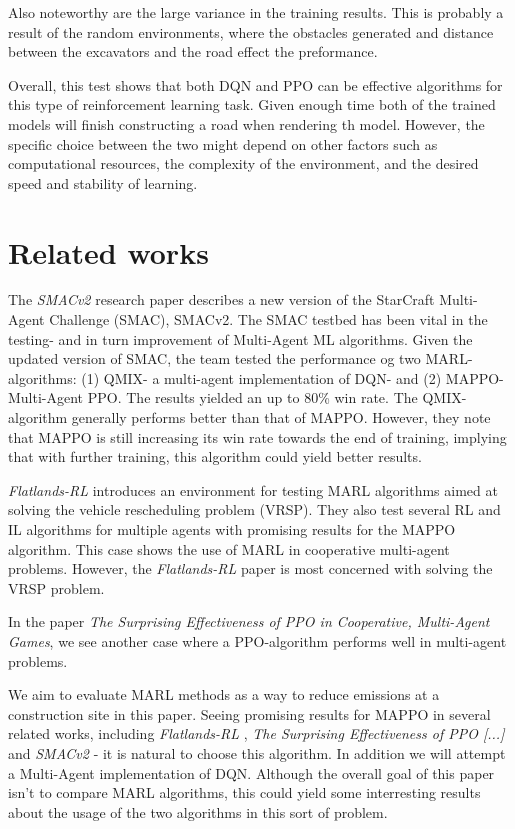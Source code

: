 \documentclass[conference]{IEEEtran}
\begin{document}
Also noteworthy are the large variance in the training results. This is probably a result of the random environments, where the obstacles generated and distance between the excavators and the road effect the preformance.

Overall, this test shows that both DQN and PPO can be effective algorithms for this type of reinforcement
learning task. Given enough time both of the trained models will finish constructing a road when rendering th model.
However, the specific choice between the two might depend on other factors such as
computational resources, the complexity of the environment, and the desired speed and stability of
learning.




\section{Related works}
The \textit{SMACv2} \cite{ellis2022smacv2} research paper describes a new version of the StarCraft Multi-Agent
Challenge (SMAC), SMACv2. The SMAC testbed has been vital in the testing- and in turn improvement
of Multi-Agent ML algorithms. Given the updated version of SMAC, the team tested the performance og two
MARL- algorithms: (1) QMIX- a multi-agent implementation of DQN- and (2) MAPPO- Multi-Agent PPO. The
results yielded an up to 80\% win rate. The QMIX-algorithm generally performs better than that of MAPPO.
However, they note that MAPPO is still increasing its win rate towards the end of training, implying
that with further training, this algorithm could yield better results.

\textit{Flatlands-RL} \cite{laurent2021flatland} introduces an environment for testing MARL algorithms aimed at
solving the vehicle rescheduling problem (VRSP). They also test several RL and IL algorithms for
multiple agents with promising results for the MAPPO algorithm. This case shows the use of MARL in cooperative
multi-agent problems. However, the \textit{Flatlands-RL} paper is most concerned with solving the VRSP problem.

In the paper \textit{The Surprising Effectiveness of PPO in Cooperative, Multi-Agent Games}, \cite{yu2022surprising}
we see another case where a PPO-algorithm performs well in multi-agent problems.

We aim to evaluate MARL methods as a way to reduce \coo{} emissions at a construction site in this paper.
Seeing promising results for MAPPO in several related works, including \textit{Flatlands-RL} \cite{laurent2021flatland},
\textit{The Surprising Effectiveness of PPO [...]} \cite{yu2022surprising} and \textit{SMACv2} \cite{ellis2022smacv2}-
it is natural to choose this algorithm. In addition we will attempt a Multi-Agent implementation of DQN. Although the
overall goal of this paper isn't to compare MARL algorithms, this could yield some interresting results about the
usage of the two algorithms in this sort of problem.
\end{document}

